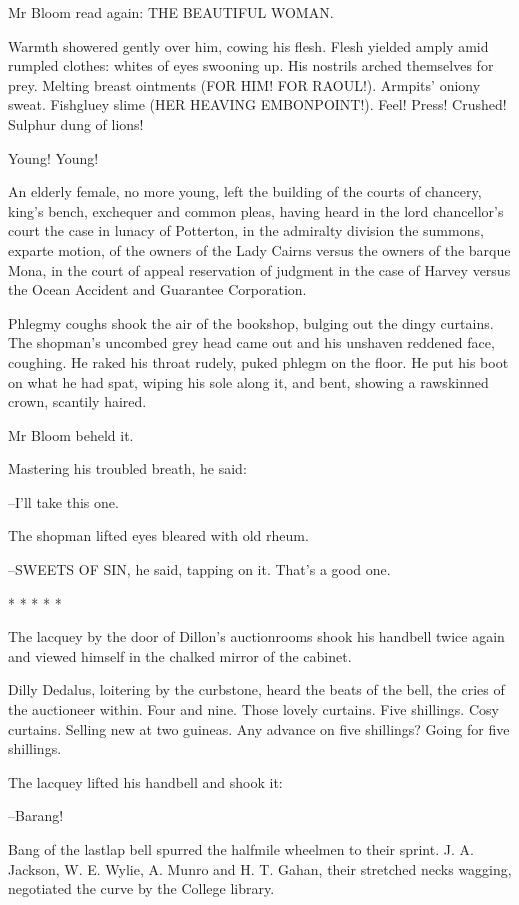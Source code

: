 Mr Bloom read again: THE BEAUTIFUL WOMAN.

Warmth showered gently over him, cowing his flesh. Flesh yielded
amply amid rumpled clothes:
whites of eyes swooning up. His nostrils
arched themselves for prey. Melting breast ointments (FOR HIM! FOR
RAOUL!). Armpits' oniony sweat. Fishgluey slime (HER HEAVING EMBONPOINT!).
Feel! Press! Crushed! Sulphur dung of lions!

Young! Young!

An elderly female, no more young, left the building of the courts of
chancery, king's bench, exchequer and common pleas, having heard in the
lord chancellor's court the case in lunacy of Potterton, in the admiralty
division the summons, exparte motion, of the owners of the Lady Cairns
versus the owners of the barque Mona, in the court of appeal reservation
of judgment
in the case of Harvey versus the Ocean Accident and Guarantee
Corporation.

Phlegmy coughs shook the air of the bookshop, bulging out the dingy
curtains. The shopman's uncombed grey head came out and his unshaven
reddened face, coughing. He raked his throat rudely, puked phlegm on the
floor. He put his boot on what he had spat, wiping his sole along it, and
bent, showing a rawskinned crown, scantily haired.

Mr Bloom beheld it.

Mastering his troubled breath, he said:

--I'll take this one.

The shopman lifted eyes
bleared with old rheum.

--SWEETS OF SIN, he said, tapping on it. That's a good one.


    * * * * *


The lacquey by the door of Dillon's auctionrooms shook his handbell
twice again and viewed himself in the chalked mirror of the cabinet.

Dilly Dedalus, loitering by the curbstone, heard the beats of the bell,
the cries of the auctioneer within. Four and nine. Those lovely curtains.
Five shillings. Cosy curtains. Selling new at two guineas. Any advance on
five shillings? Going for five shillings.

The lacquey lifted his handbell and shook it:

--Barang!%

Bang of the lastlap bell spurred the halfmile wheelmen to their sprint.
J. A. Jackson, W. E. Wylie, A. Munro and H. T. Gahan, their stretched
necks wagging, negotiated the curve by the College library.


